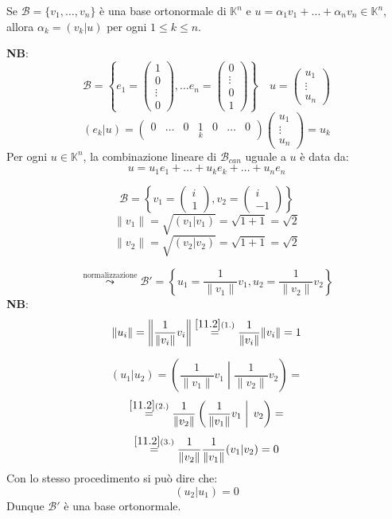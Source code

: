\documentclass[a4paper]{article}
\theoremstyle{break}
\theoremstyle{break}
\theoremstyle{break}
\theoremstyle{break}
\begin{document}
\vspace{1em}
\noindent Se \( \mathcal{B} = \{v_1, \ldots, v_n\} \) è una base ortonormale di
\( \mathbb{K}^n \) e \( u = \alpha_1 v_1 + \ldots + \alpha_n v_n \in \mathbb{K}^n \),
allora \( \alpha_k = (v_k|u) \) per ogni \( 1 \le k \le n \).

\vspace{1em}
\noindent \textbf{NB}:
\[
\mathcal{B} = \left\{e_1 = \begin{pmatrix} 
  1\\
  0\\
  \vdots\\
  0
\end{pmatrix},
\ldots
e_n = \begin{pmatrix} 
  0\\
  \vdots\\
  0\\
  1
\end{pmatrix}
\right\} 
\quad u = \begin{pmatrix} 
  u_1\\
  \vdots\\
  u_n
\end{pmatrix} 
\] 
\[
  (e_k|u) = \begin{pmatrix} 
    0 & \ldots & 0 & \underset{k}{1} & 0 & \ldots & 0
  \end{pmatrix}
  \begin{pmatrix} 
    u_1\\
    \vdots\\
    u_n
  \end{pmatrix}
  = u_k
\] 
Per ogni \( u \in \mathbb{K}^n \), la combinazione lineare di \( \mathcal{B}_{can} \) 
uguale a \( u \) è data da:
\[
u = u_1e_1 + \ldots + u_k e_k + \ldots + u_ne_n
\] 
\begin{example}
  \[
  \mathcal{B} = \left\{ 
    v_1 = \begin{pmatrix} 
      i\\1
    \end{pmatrix} ,
    v_2 = \begin{pmatrix} 
      i\\-1
    \end{pmatrix}
  \right\} 
  \] 
  \[
  \|v_1\| = \sqrt{(v_1|v_1)} = \sqrt{1 + 1} = \sqrt{2}
  \] 
  \[
  \|v_2\| = \sqrt{(v_2|v_2)} = \sqrt{1 + 1} = \sqrt{2}
  \] 

  \[
    \stackrel{\text{normalizzazione}}{\leadsto} \mathcal{B}' = \left\{ 
      u_1 = \frac{1}{\|v_1\|}v_1,
      u_2 = \frac{1}{\|v_2\|}v_2
    \right\} 
  \] 
  \textbf{NB}:
  \[
    \|u_i\| = \left\| \frac{1}{\|v_i\|}v_i \right\| \stackrel{\ref{11.2}(1.)}{=}
    \frac{1}{\|v_i\|} \|v_i\| = 1
  \] 

  \[
    (u_1|u_2) = \left(\left. \frac{1}{\|v_1\|}v_1 \; \right| \; \frac{1}{\|v_2\|}v_2 \right) =
  \] 
  \[
    \stackrel{\ref{11.2}(2.)}{=} \frac{1}{\|v_2\|} \left(\left. \frac{1}{\|v_1\|}v_1 \; \right| \; v_2 \right) =
  \] 
  \[
    \stackrel{\ref{11.2}(3.)}{=} \frac{1}{\|v_2\|} \frac{1}{\|v_1\|} (v_1|v_2) = 0
  \] 
  Con lo stesso procedimento si può dire che:
  \[
    (u_2|u_1) = 0
  \] 
  \vspace{1em}
  Dunque \( \mathcal{B}' \) è una base ortonormale.
\end{example}
\end{document}

